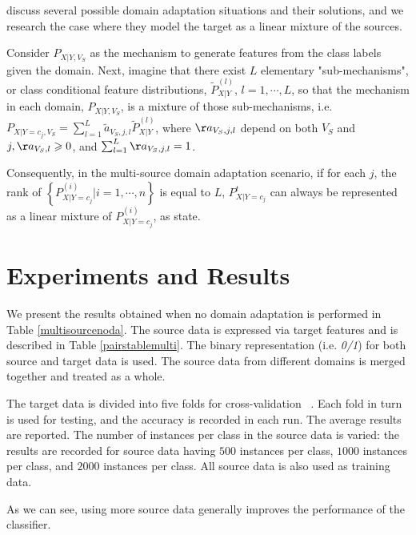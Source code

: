 \citep{mda} discuss several possible domain adaptation situations and their solutions, and we research the case where they model the target as a linear mixture of the sources. 

Consider $P_{X|Y, V_S}$ as the mechanism to generate features from the class labels given the domain. Next, imagine that there exist $L$ elementary "sub-mechanisms", or class conditional feature distributions, $\tilde{P}_{X|Y}^{(l)}$, $l = 1, \cdots, L$, so that the mechanism in each domain, $P_{X|Y, V_S}$, is a mixture of those sub-mechanisms, i.e. $P_{X|Y=c_j, V_S} = \sum_{l=1}^{L} \tilde{a}_{V_S, j, l} \tilde{P}_{X|Y}^{(l)}$, where ${\aa}_{V_S, j, l}$ depend on both $V_S$ and $j, {\aa}_{V_S, l} \geqslant 0$, and $\sum_{l=1}^{L} \aa_{V_S, j, l} = 1$. 

Consequently, in the multi-source domain adaptation scenario, if for each $j$, the rank of $\left \{P_{X|Y=c_j}^{(i)} | i = 1, \cdots, n \right \}$ is equal to $L$, $P_{X|Y=c_j}^{t}$ can always be represented as a linear mixture of $P_{X|Y=c_j}^{(i)}$, as \citep{mda} state.




\section{Experiments and Results}
\label{mdaexperiments}

We present the results obtained when no domain adaptation is performed in Table \ref{multisourcenoda}. The source data is expressed via target features and is described in Table \ref{pairstablemulti}. The binary representation (i.e. \textit{0/1}) for both source and target data is used. The source data from different domains is merged together and treated as a whole.

The target data is divided into five folds for cross-validation ~\citep{hastie}. Each fold in turn is used for testing, and the accuracy is recorded in each run. The average results are reported. The number of instances per class in the source data is varied: the results are recorded for source data having $500$ instances per class, $1000$ instances per class, and $2000$ instances per class. All source data is also used as training data. 

As we can see, using more source data generally improves the performance of the classifier.

